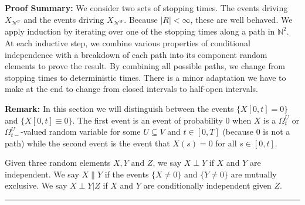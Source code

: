 \documentclass[12pt]{article}
\newcommand{\skipLine}{\vspace{12pt}}
\newcommand{\mb}{\mathbb}
\newcommand{\mc}{\mathcal}
\newcommand{\te}{\text}
\newcommand{\pfsum}{\textbf{Proof Summary: }}
\newcommand{\ind}{\hspace{24pt}}
\newcommand{\lin}{\rule{\linewidth}{0.4 pt}}
\renewcommand{\U}{U}							%
\newcommand{\UU}{W}								%
\newcommand{\UUU}{R}							%
\newcommand{\T}{T}								%
\renewcommand{\t}{t}							%
\newcommand{\sset}{\Omega}						%
\renewcommand{\tt}{s}							%
\newcommand{\X}{X}								%
\newcommand{\neigh}{\mc{N}}						%
\newcommand{\vind}[1]{^{#1}}					%
\newcommand{\vsi}[1]{^{#1}}						%
\newcommand{\cind}[1]{_{#1}}					%
\newcommand{\tp}[1]{(#1)}						%
\newcommand{\tip}[1]{#1}						%
\newcommand{\ts}[1]{_{#1}}						%
\newcommand{\XX}{Y}								%
\newcommand{\XXX}{Z}							%
\newcommand{\mutex}{\|}							%
\begin{document}
\pfsum We consider two sets of stopping times. The events driving \(\X\cind{\neigh\vind{\U}}\) and the events driving \(\X\cind{\neigh\vind{\UU}}\). Because \(|\UUU| < \infty\), these are well behaved. We apply induction by iterating over one of the stopping times along a path in \(\mb{N}^2\). At each inductive step, we combine various properties of conditional independence with a breakdown of each path into its component random elements to prove the result. By combining all possible paths, we change from stopping times to deterministic times. There is a minor adaptation we have to make at the end to change from closed intervals to half-open intervals.

\skipLine

\textbf{Remark:} In this section we will distinguish between the events \(\{\X\tip{[0,\t]} = 0\}\) and \(\{\X\tip{[0,\t]}\equiv 0\}\). The first event is an event of probability 0 when \(\X\) is a \(\sset\vsi{\U}\ts{\t}\) or \(\sset\vsi{\U}\ts{\t-}\)-valued random variable for some \(\U\subseteq V\) and \(\t \in [0,\T]\) (because 0 is not a path) while the second event is the event that \(\X\tp{\tt} = 0\) for all \(\tt \in [0,\t]\).

\ind Given three random elements \(\X,\XX \te{ and } \XXX\), we say \(\X\perp \XX\) if \(\X\) and \(\XX\) are independent. We say \(\X\mutex \XX\) if the events \(\{\X\neq 0\}\) and \(\{\XX \neq 0\}\) are mutually exclusive. We say \(\X\perp \XX|\XXX\) if \(\X\) and \(\XX\) are conditionally independent given \(\XXX\).

\lin
\end{document}
